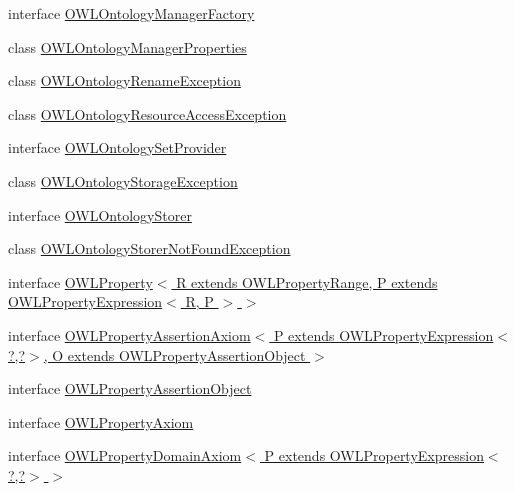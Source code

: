 \begin{DoxyCompactItemize}
interface \hyperlink{interfaceorg_1_1semanticweb_1_1owlapi_1_1model_1_1_o_w_l_ontology_manager_factory}{O\-W\-L\-Ontology\-Manager\-Factory}
\item 
class \hyperlink{classorg_1_1semanticweb_1_1owlapi_1_1model_1_1_o_w_l_ontology_manager_properties}{O\-W\-L\-Ontology\-Manager\-Properties}
\item 
class \hyperlink{classorg_1_1semanticweb_1_1owlapi_1_1model_1_1_o_w_l_ontology_rename_exception}{O\-W\-L\-Ontology\-Rename\-Exception}
\item 
class \hyperlink{classorg_1_1semanticweb_1_1owlapi_1_1model_1_1_o_w_l_ontology_resource_access_exception}{O\-W\-L\-Ontology\-Resource\-Access\-Exception}
\item 
interface \hyperlink{interfaceorg_1_1semanticweb_1_1owlapi_1_1model_1_1_o_w_l_ontology_set_provider}{O\-W\-L\-Ontology\-Set\-Provider}
\item 
class \hyperlink{classorg_1_1semanticweb_1_1owlapi_1_1model_1_1_o_w_l_ontology_storage_exception}{O\-W\-L\-Ontology\-Storage\-Exception}
\item 
interface \hyperlink{interfaceorg_1_1semanticweb_1_1owlapi_1_1model_1_1_o_w_l_ontology_storer}{O\-W\-L\-Ontology\-Storer}
\item 
class \hyperlink{classorg_1_1semanticweb_1_1owlapi_1_1model_1_1_o_w_l_ontology_storer_not_found_exception}{O\-W\-L\-Ontology\-Storer\-Not\-Found\-Exception}
\item 
interface \hyperlink{interfaceorg_1_1semanticweb_1_1owlapi_1_1model_1_1_o_w_l_property_3_01_r_01extends_01_o_w_l_prop80b13791851fd41214e27e841bc7d0d9}{O\-W\-L\-Property$<$ R extends O\-W\-L\-Property\-Range, P extends O\-W\-L\-Property\-Expression$<$ R, P $>$ $>$}
\item 
interface \hyperlink{interfaceorg_1_1semanticweb_1_1owlapi_1_1model_1_1_o_w_l_property_assertion_axiom_3_01_p_01extenfb1174ccf37bb5b6f03e62cba90873cf}{O\-W\-L\-Property\-Assertion\-Axiom$<$ P extends O\-W\-L\-Property\-Expression$<$?,?$>$, O extends O\-W\-L\-Property\-Assertion\-Object $>$}
\item 
interface \hyperlink{interfaceorg_1_1semanticweb_1_1owlapi_1_1model_1_1_o_w_l_property_assertion_object}{O\-W\-L\-Property\-Assertion\-Object}
\item 
interface \hyperlink{interfaceorg_1_1semanticweb_1_1owlapi_1_1model_1_1_o_w_l_property_axiom}{O\-W\-L\-Property\-Axiom}
\item 
interface \hyperlink{interfaceorg_1_1semanticweb_1_1owlapi_1_1model_1_1_o_w_l_property_domain_axiom_3_01_p_01extends_d1b0dc6247c6225898c4a4edc4291fb6}{O\-W\-L\-Property\-Domain\-Axiom$<$ P extends O\-W\-L\-Property\-Expression$<$?,?$>$ $>$}

\end{DoxyCompactItemize}
